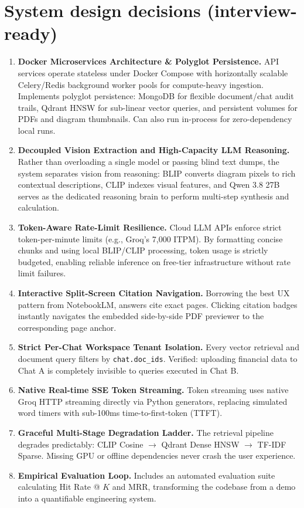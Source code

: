\documentclass[11pt,a4paper]{article}
\begin{document}
\section{System design decisions (interview-ready)}
\begin{enumerate}[leftmargin=1.2cm]
\item \textbf{Docker Microservices Architecture \& Polyglot Persistence.} API services operate stateless under Docker Compose with horizontally scalable Celery/Redis background worker pools for compute-heavy ingestion. Implements polyglot persistence: MongoDB for flexible document/chat audit trails, Qdrant HNSW for sub-linear vector queries, and persistent volumes for PDFs and diagram thumbnails. Can also run in-process for zero-dependency local runs.
\item \textbf{Decoupled Vision Extraction and High-Capacity LLM Reasoning.} Rather than overloading a single model or passing blind text dumps, the system separates vision from reasoning: BLIP converts diagram pixels to rich contextual descriptions, CLIP indexes visual features, and Qwen 3.8 27B serves as the dedicated reasoning brain to perform multi-step synthesis and calculation.
\item \textbf{Token-Aware Rate-Limit Resilience.} Cloud LLM APIs enforce strict token-per-minute limits (e.g., Groq's 7,000 ITPM). By formatting concise chunks and using local BLIP/CLIP processing, token usage is strictly budgeted, enabling reliable inference on free-tier infrastructure without rate limit failures.
\item \textbf{Interactive Split-Screen Citation Navigation.} Borrowing the best UX pattern from NotebookLM, answers cite exact pages. Clicking citation badges instantly navigates the embedded side-by-side PDF previewer to the corresponding page anchor.
\item \textbf{Strict Per-Chat Workspace Tenant Isolation.} Every vector retrieval and document query filters by \texttt{chat.doc\_ids}. Verified: uploading financial data to Chat A is completely invisible to queries executed in Chat B.
\item \textbf{Native Real-time SSE Token Streaming.} Token streaming uses native Groq HTTP streaming directly via Python generators, replacing simulated word timers with sub-100ms time-to-first-token (TTFT).
\item \textbf{Graceful Multi-Stage Degradation Ladder.} The retrieval pipeline degrades predictably: CLIP Cosine $\rightarrow$ Qdrant Dense HNSW $\rightarrow$ TF-IDF Sparse. Missing GPU or offline dependencies never crash the user experience.
\item \textbf{Empirical Evaluation Loop.} Includes an automated evaluation suite calculating Hit Rate @ $K$ and MRR, transforming the codebase from a demo into a quantifiable engineering system.
\end{enumerate}
\end{document}
